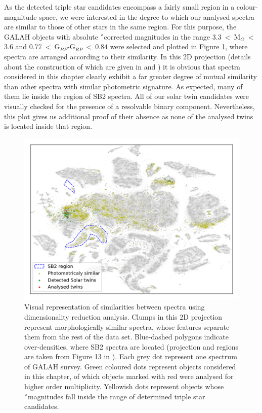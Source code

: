 As the detected triple star candidates encompass a fairly small region in a colour-magnitude space, we were interested in the degree to which our analysed spectra are similar to those of other stars in the same region. For this purpose, the GALAH objects with absolute \G\ corrected magnitudes in the range $3.3$~<~M$_{G}$~<~$3.6$ and $0.77$~<~G$_{BP}$-G$_{RP}$~<~$0.84$ were selected and plotted in Figure \ref{fig:tsne_marked}, where spectra are arranged according to their similarity. In this 2D projection (details about the construction of which are given in \citet{2017ApJS..228...24T} and \citet{buder2018}) it is obvious that spectra considered in this chapter clearly exhibit a far greater degree of mutual similarity than other spectra with similar photometric signature. As expected, many of them lie inside the region of SB2 spectra. All of our solar twin candidates were visually checked for the presence of a resolvable binary component. Nevertheless, this plot gives us additional proof of their absence as none of the analysed twins is located inside that region.

\begin{figure}
	\centering
	\includegraphics[width=\textwidth]{evaluated_all_tsne.png}
	\caption{Visual representation of similarities between spectra using dimensionality reduction analysis. Clumps in this 2D projection represent morphologically similar spectra, whose features separate them from the rest of the data set. Blue-dashed polygons indicate over-densities, where SB2 spectra are located (projection and regions are taken from Figure 13 in \citet{buder2018}). Each grey dot represent one spectrum of GALAH survey. Green coloured dots represent objects considered in this chapter, of which objects marked with red were analysed for higher order multiplicity. Yellowish dots represent objects whose \G\ magnitudes fall inside the range of determined triple star candidates.}
	\label{fig:tsne_marked}
\end{figure}

